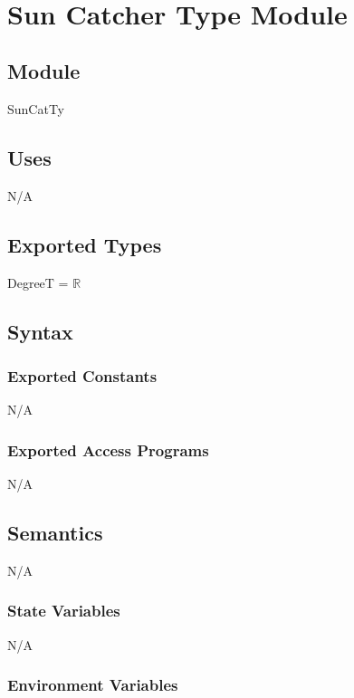 \documentclass[12pt, titlepage]{article}
\begin{document}
~\newpage

\section{Sun Catcher Type Module} \label{ModuleSCTM} 

\subsection{Module}
SunCatTy

\subsection{Uses}

N/A\\

\subsection{Exported Types}

DegreeT = $\mathbb{R}$\\

\subsection{Syntax}

\subsubsection{Exported Constants}
N/A\\

\subsubsection{Exported Access Programs}
N/A\\

\subsection{Semantics}
N/A\\
\subsubsection{State Variables}
N/A\\

\subsubsection{Environment Variables}
\end{document}

